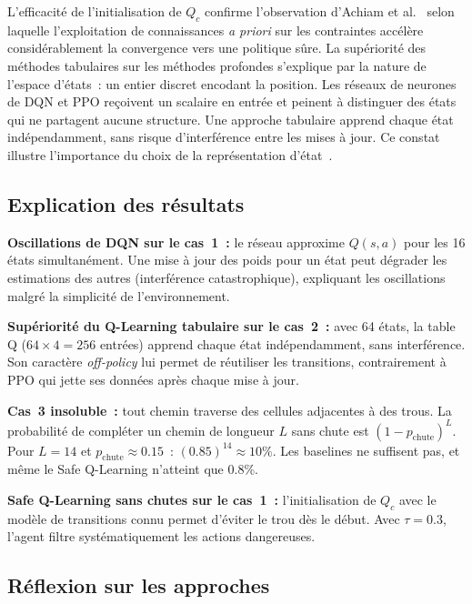 \documentclass{article}
\begin{document}
L'efficacité de l'initialisation de $Q_c$ confirme l'observation d'Achiam et al.~\cite{achiam2017constrained} selon laquelle l'exploitation de connaissances \textit{a priori} sur les contraintes accélère considérablement la convergence vers une politique sûre. La supériorité des méthodes tabulaires sur les méthodes profondes s'explique par la nature de l'espace d'états~: un entier discret encodant la position. Les réseaux de neurones de DQN et PPO reçoivent un scalaire en entrée et peinent à distinguer des états qui ne partagent aucune structure. Une approche tabulaire apprend chaque état indépendamment, sans risque d'interférence entre les mises à jour. Ce constat illustre l'importance du choix de la représentation d'état~\cite{mnih2015human}.

\subsection{Explication des résultats}

\textbf{Oscillations de DQN sur le cas~1~:} le réseau approxime $Q(s,a)$ pour les 16 états simultanément. Une mise à jour des poids pour un état peut dégrader les estimations des autres (interférence catastrophique), expliquant les oscillations malgré la simplicité de l'environnement.

\textbf{Supériorité du Q-Learning tabulaire sur le cas~2~:} avec 64 états, la table Q ($64 \times 4 = 256$ entrées) apprend chaque état indépendamment, sans interférence. Son caractère \textit{off-policy} lui permet de réutiliser les transitions, contrairement à PPO qui jette ses données après chaque mise à jour.

\textbf{Cas~3 insoluble~:} tout chemin traverse des cellules adjacentes à des trous. La probabilité de compléter un chemin de longueur $L$ sans chute est $(1 - p_{\text{chute}})^L$. Pour $L = 14$ et $p_{\text{chute}} \approx 0.15$~: $(0.85)^{14} \approx 10\%$. Les baselines ne suffisent pas, et même le Safe Q-Learning n'atteint que 0.8\%.

\textbf{Safe Q-Learning sans chutes sur le cas~1~:} l'initialisation de $Q_c$ avec le modèle de transitions connu permet d'éviter le trou dès le début. Avec $\tau = 0.3$, l'agent filtre systématiquement les actions dangereuses.

\subsection{Réflexion sur les approches}
\end{document}
